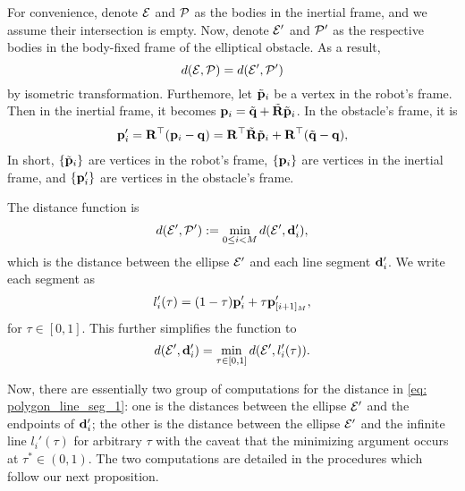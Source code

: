 For convenience, denote ${\cal E}$ and ${\cal P}$ as the bodies in the inertial frame, and we assume their intersection is empty. Now, denote ${\cal E}'$ and ${\cal P}'$ as the respective bodies in the body-fixed frame of the elliptical obstacle. As a result, 
\begin{equation}
\label{eq: distance_frames}
    d({\cal E}, {\cal P}) = d({\cal E}',{\cal P}')
\end{equation}
by isometric transformation.
Furthemore, let $\tilde{\mathbf{p}}_i$ be a vertex in the robot's frame. Then in the inertial frame, it becomes $\mathbf{p}_i = \Tilde{\mathbf{q}} + \tilde{\mathbf{R}} \Tilde{\mathbf{p}}_i$. In the obstacle's frame, it is 
\begin{align}
    \mathbf{p}_i' 
        = \mathbf{R}^\top(\mathbf{p}_i - \mathbf{q})
        = \mathbf{R}^\top \tilde{\mathbf{R}} \Tilde{\mathbf{p}}_i + \mathbf{R}^\top(\Tilde{\mathbf{q}} -\mathbf{q}),
\label{eq: vertices_ellipse_frame}
\end{align}
In short, $\{\tilde{\mathbf{p}}_i\}$ are vertices in the robot's frame, $\{\mathbf{p}_i\}$ are vertices in the inertial frame, and $\{\mathbf{p}_i'\}$ are vertices in the obstacle's frame.

The distance function is
\begin{equation}
\label{eq: polygon_ellipse_1}
        d({\cal E}', {\cal P}') := \min_{0 \leq i < M} d({\cal E}', \mathbf{d}_i'),
\end{equation}
%
which is the distance between the ellipse ${\cal E}'$ and each line segment $\mathbf{d}_i'$. We write each segment as
\begin{equation}
\label{eq: line_segment_i}
    l_i'(\tau) = (1-\tau)\mathbf{p}_i' + \tau \mathbf{p}_{[i+1]_{M}}',
\end{equation}
for $\tau \in [0,1]$. This further simplifies the function to
\begin{equation}
\label{eq: polygon_line_seg_1}
    d({\cal E}', \mathbf{d}_i') = \min_{\tau \in [0,1]} d({\cal E}', l_i'(\tau)).
\end{equation}

Now, there are essentially two group of computations for the distance in \eqref{eq: polygon_line_seg_1}: one is the distances between the ellipse ${\cal E}'$ and the endpoints of $\mathbf{d}_i'$; the other is the distance between the ellipse ${\cal E}'$ and the infinite line $l_i'(\tau)$ for arbitrary $\tau$ with the caveat that the minimizing argument occurs at $\tau^* \in (0,1)$. The two computations are detailed in the procedures which follow our next proposition.


